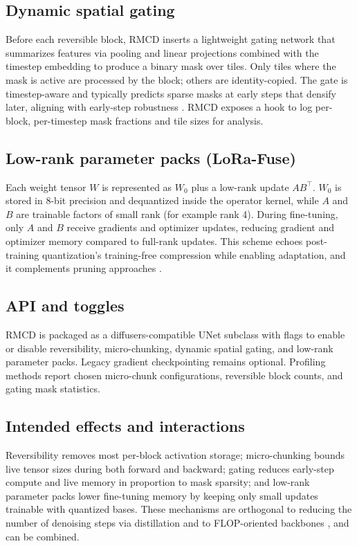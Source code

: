\documentclass{article}
\begin{document}
\subsection{Dynamic spatial gating}
Before each reversible block, RMCD inserts a lightweight gating network that summarizes features via pooling and linear projections combined with the timestep embedding to produce a binary mask over tiles. Only tiles where the mask is active are processed by the block; others are identity-copied. The gate is timestep-aware and typically predicts sparse masks at early steps that densify later, aligning with early-step robustness \cite{author-year-leveraging}. RMCD exposes a hook to log per-block, per-timestep mask fractions and tile sizes for analysis.

\subsection{Low-rank parameter packs (LoRa-Fuse)}
Each weight tensor \(W\) is represented as \(W_0\) plus a low-rank update \(AB^\top\). \(W_0\) is stored in 8-bit precision and dequantized inside the operator kernel, while \(A\) and \(B\) are trainable factors of small rank (for example rank 4). During fine-tuning, only \(A\) and \(B\) receive gradients and optimizer updates, reducing gradient and optimizer memory compared to full-rank updates. This scheme echoes post-training quantization’s training-free compression \cite{shang-2022-post} while enabling adaptation, and it complements pruning approaches \cite{fang-2023-structural}.

\subsection{API and toggles}
RMCD is packaged as a diffusers-compatible UNet subclass with flags to enable or disable reversibility, micro-chunking, dynamic spatial gating, and low-rank parameter packs. Legacy gradient checkpointing remains optional. Profiling methods report chosen micro-chunk configurations, reversible block counts, and gating mask statistics.

\subsection{Intended effects and interactions}
Reversibility removes most per-block activation storage; micro-chunking bounds live tensor sizes during both forward and backward; gating reduces early-step compute and live memory in proportion to mask sparsity; and low-rank parameter packs lower fine-tuning memory by keeping only small updates trainable with quantized bases. These mechanisms are orthogonal to reducing the number of denoising steps via distillation \cite{salimans-2024-multistep} and to FLOP-oriented backbones \cite{yan-2023-diffusion}, and can be combined.
\end{document}
